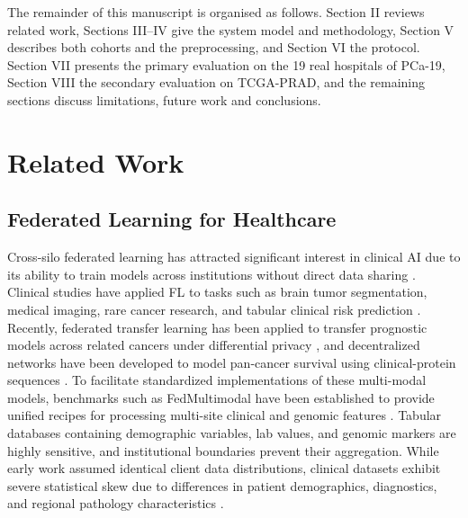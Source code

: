 \documentclass[journal]{IEEEtran}
\begin{document}
The remainder of this manuscript is organised as follows. Section II reviews related work, Sections III--IV give the system model and methodology, Section V describes both cohorts and the preprocessing, and Section VI the protocol. Section VII presents the primary evaluation on the 19 real hospitals of PCa-19, Section VIII the secondary evaluation on TCGA-PRAD, and the remaining sections discuss limitations, future work and conclusions.

\section{Related Work}



\subsection{Federated Learning for Healthcare}
Cross-silo federated learning has attracted significant interest in clinical AI due to its ability to train models across institutions without direct data sharing \cite{Rieke2020DigitalHealth, Sheller2020MedicineFL, Li2021SurveyFLMedical}. Clinical studies have applied FL to tasks such as brain tumor segmentation, medical imaging, rare cancer research, and tabular clinical risk prediction \cite{Pati2022GFLMedical}. Recently, federated transfer learning has been applied to transfer prognostic models across related cancers under differential privacy \cite{Wen2025Federated}, and decentralized networks have been developed to model pan-cancer survival using clinical-protein sequences \cite{Chai2024AdFed}. To facilitate standardized implementations of these multi-modal models, benchmarks such as FedMultimodal have been established to provide unified recipes for processing multi-site clinical and genomic features \cite{feng2023fedmultimodal}. Tabular databases containing demographic variables, lab values, and genomic markers are highly sensitive, and institutional boundaries prevent their aggregation. While early work assumed identical client data distributions, clinical datasets exhibit severe statistical skew due to differences in patient demographics, diagnostics, and regional pathology characteristics \cite{Kairouz2021FLAdvances, Yang2019ConceptFL}.
\end{document}
